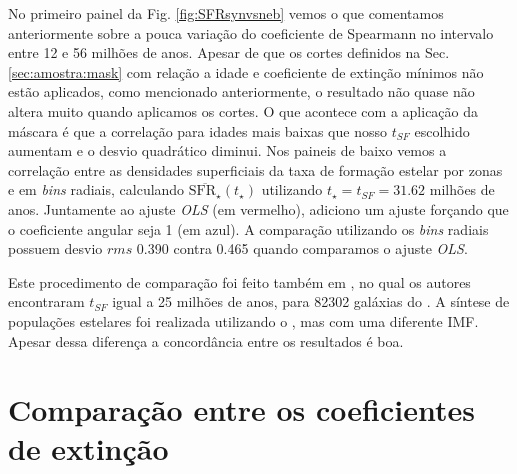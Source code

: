 No primeiro painel da Fig. \ref{fig:SFRsynvsneb} vemos o que comentamos anteriormente sobre a pouca
variação do coeficiente de Spearmann no intervalo entre 12 e 56 milhões de anos. Apesar de que os
cortes definidos na Sec. \ref{sec:amostra:mask} com relação a idade e coeficiente de extinção
mínimos não estão aplicados, como mencionado anteriormente, o resultado não quase não altera muito
quando aplicamos os cortes. O que acontece com a aplicação da máscara é que a correlação para idades
mais baixas que nosso $t_{SF}$ escolhido aumentam e o desvio quadrático diminui. Nos paineis de
baixo vemos a correlação entre as densidades superficiais da taxa de formação estelar por zonas e
em {\em bins} radiais, calculando $\overline{\mathrm{SFR}_\star}(t_\star)$ utilizando $t_\star =
t_{SF} = 31.62$ milhões de anos. Juntamente ao ajuste {\em OLS} (em vermelho), adiciono um ajuste
forçando que o coeficiente angular seja 1 (em azul). A comparação utilizando os {\em bins} radiais
possuem desvio $rms$ 0.390 contra 0.465 quando comparamos o ajuste {\em OLS}.
 
Este procedimento de comparação foi feito também em \citet{Asari.etal.2007a}, no qual os autores
encontraram $t_{SF}$ igual a 25 milhões de anos, para 82302 galáxias do \SDSS. A síntese de
populações estelares foi realizada utilizando o \starlight, mas com uma diferente IMF. Apesar dessa
diferença a concordância entre os resultados é boa.


\section{Comparação entre os coeficientes de extinção}
\label{sec:synvsneb:tauv}

